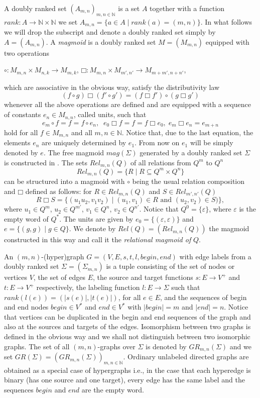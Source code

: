 \documentclass[runningheads,a4paper]{llncs}
\newcommand{\N}{\mathbb{N}}
\newcommand{\bx}{\mathbin{\Box}}
\begin{document}
A doubly ranked set  $(A_{m,n})_{m,n\in\N}$ is a set $A$ together with a function $rank: A\to \N\times \N$ we set $A_{m,n}=\{a \in A \mid
rank(a)=(m,n)\}$. In what follows we will drop the subscript   and denote a doubly ranked set simply by $A=(A_{m,n})$.
A \emph{magmoid} is a doubly ranked set $M=(M_{m,n})$
equipped with two operations
\begin{center}
$\circ : M_{m,n}\times M_{n,k}\to M_{m,k}$,
\quad
$\bx : M_{m,n}\times M_{m',n'}\to M_{m+m',n+n'}$,
\end{center}
which are associative in the obvious way, satisfy the
distributivity law
\[
(f\circ g)\bx (f'\circ g')=(f\bx f')\circ (g\bx g')
\]
whenever all the above operations are defined and are equipped with a
sequence of constants $e_n\in M_{n,n}$,  called units, such that
\[
e_m\circ f=f=f\circ e_n,\;\; e_0\bx f=f=f\bx e_0,\; e_m\bx e_n =e_{m+n}
\]
hold for all $f\in M_{m,n}$ and  all $m,n\in \N$.
Notice that, due to the last equation, the elements $e_n$ are uniquely determined by $e_1$. From now on $e_1$ will be
simply denoted by $e$. The free magmoid $mag(\Sigma)$ generated by a doubly ranked set $\Sigma$ is constructed in \cite{BK1}. The sets $Rel_{m,n}(Q)$ of all relations from $Q^m$ to $Q^n$
\[
Rel_{m,n}(Q)=\{R\mid R \subseteq Q^m\times Q^n \}
\]
can be structured into a magmoid with $\circ$ being the usual
relation composition and $\bx$ defined as follows: for $R\in Rel_{m,n}(Q)$ and $S\in
Rel_{m',n'}(Q)$
\[
R\bx S=\{(u_1u_2,v_1v_2)\mid (u_1,v_1)\in R\mbox{ and }(u_2,v_2)\in S)\},
\]
where $u_1\in Q^m$, $u_2\in Q^{m'}$, $v_1\in Q^n$, $v_2\in Q^{n'}$. Notice that $Q^0=\{\varepsilon\}$, where $\varepsilon$ is the empty word of $Q^*$. The units are given by
$ e_0=\{(\varepsilon,\varepsilon)\}$ and $
e=\{(g,g)\mid g\in Q\}$.
We denote by $Rel(Q)=(Rel_{m,n}(Q))$ the magmoid  constructed in this way and call it the \emph{relational magmoid of} $Q$.


 An $(m,n)$-(hyper)graph $G=(V,E,s,t, l,begin,end)$ with edge labels from a doubly ranked set $\Sigma =(\Sigma_{m,n})$ is a tuple   consisting of the set of nodes or vertices $V$, the set of edges $E$,   the source and target functions $s:E \to V ^+$ and $t:E\to V ^+$ respectively,    the labeling function $l:E \to \Sigma$ such that  $rank(l(e))=(|s(e)|,|t(e)|)$, for all $e\in E $,  and  the sequences of begin and end nodes $begin\in V^*$ and $end\in V^*$ with $|begin|=m$ and $|end|=n$. Notice that vertices can be duplicated in the begin and end sequences of the graph and also at the sources and targets of the edges. Isomorphism between two graphs is defined in the obvious way and we shall not distinguish between two isomorphic  graphs. The set of all  $(m,n)$-graphs over $\Sigma$ is
denoted by $GR_{m,n}(\Sigma)$  and we set $GR(\Sigma)=(GR_{m,n}(\Sigma))_{m,n\in\N}$. Ordinary unlabeled directed graphs are obtained as a special case of hypergraphs i.e., in the case that each hyperedge is binary (has one source and one target), every edge has the same label and the sequences $begin$ and $end$ are the empty word.
\end{document}
